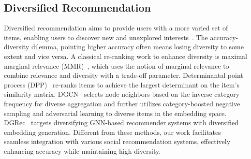 \subsection{Diversified Recommendation}
Diversified recommendation aims to provide users with a more varied set of items, enabling users to discover new and unexplored interests~\cite{chen2020improving,liang2021enhancing}. The accuracy-diversity dilemma, pointing higher accuracy often means losing diversity to some extent and vice versa. A classical re-ranking work to enhance diversity is maximal marginal relevance (MMR)~\cite{carbonell1998use}, which uses the notion of marginal relevance to combine relevance and diversity with a trade-off parameter. Determinantal point process (DPP)~\cite{chen2018fast} re-ranks items to achieve the largest determinant on the item’s similarity matrix. DGCN~\cite{zheng2021dgcn} selects node neighbors based on the inverse category frequency for diverse aggregation and further utilizes category-boosted negative sampling and adversarial learning to diverse items in the embedding space. DGRec~\cite{yang2023dgrec} targets diversifying GNN-based recommender systems with diversified embedding generation. Different from these methods, our work facilitates seamless integration with various social recommendation systems, effectively enhancing accuracy while maintaining high diversity.
